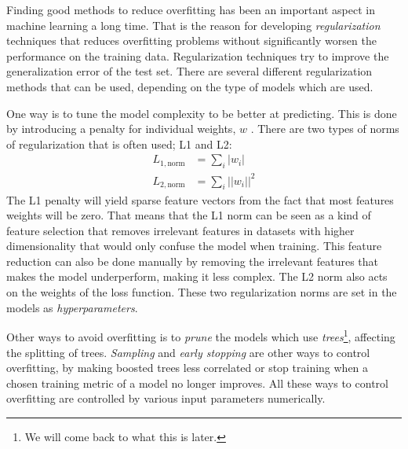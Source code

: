 \documentclass[a4paper, american, 12pt]{report}
\begin{document}
	Finding good methods to reduce overfitting has been an important aspect in machine learning a long time. That is the reason for developing \textit{regularization} techniques that reduces overfitting problems without significantly worsen the performance on the training data. Regularization techniques try to improve the generalization error of the test set. There are several different regularization methods that can be used, depending on the type of models which are used.
	
	One way is to tune the model complexity to be better at predicting. This is done by introducing a penalty for individual weights, $w$ . There are two types of norms of regularization that is often used; L1 and L2:
	\begin{align}
	\label{eq:L1Reg}
		L_{1,\text{norm}}&=\sum_{i}|w_i|\\
	\label{eq:L2Reg}
		L_{2,\text{norm}}&=\sum_{i}||w_i||^2
	\end{align}
	The L1 penalty will yield sparse feature vectors from the fact that most features weights will be zero. That means that the L1 norm can be seen as a kind of feature selection that removes irrelevant features in datasets with higher dimensionality that would only confuse the model when training. This feature reduction can also be done manually by removing the irrelevant features that makes the model underperform, making it less complex. The L2 norm also acts on the weights of the loss function. These two regularization norms are set in the models as \textit{hyperparameters}.
	
	Other ways to avoid overfitting is to \textit{prune} the models which use \textit{trees}\footnote{We will come back to what this is later.}, affecting the splitting of trees. \textit{Sampling} and \textit{early stopping} are other ways to control overfitting, by making boosted trees less correlated or stop training when a chosen training metric of a model no longer improves. All these ways to control overfitting are controlled by various input parameters numerically.
	
	
\end{document}
